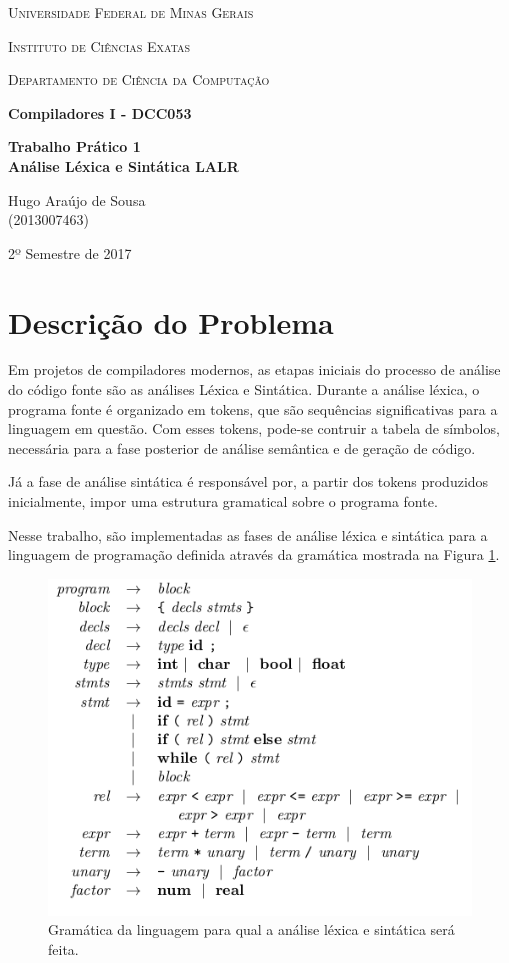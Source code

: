 \documentclass[a4paper,12pt]{report}
\begin{document}
\begin{titlepage}
	\centering
	{\scshape\LARGE Universidade Federal de Minas Gerais \par}
	{\scshape\Large Instituto de Ciências Exatas \par}
	{\scshape\Large Departamento de Ciência da Computação \par}
	\vfill
	{\huge\bfseries \textbf{Compiladores I - DCC053} \par}
	{\huge\bfseries \textbf{Trabalho Prático 1\\Análise Léxica e Sintática LALR} \par}
	\vfill
	{\Large Hugo Araújo de Sousa\\(2013007463)\par}
	\vfill
	{\large 2º Semestre de 2017\par}
\end{titlepage}

\newpage
\tableofcontents
\newpage

\section{Descrição do Problema}

Em projetos de compiladores modernos, as etapas iniciais do processo de análise
do código fonte são as análises Léxica e Sintática. Durante a análise léxica, o
programa fonte é organizado em tokens, que são sequências significativas para
a linguagem em questão. Com esses tokens, pode-se contruir a tabela de símbolos,
necessária para a fase posterior de análise semântica e de geração de código.

Já a fase de análise sintática é responsável por, a partir dos tokens produzidos
inicialmente, impor uma estrutura gramatical sobre o programa fonte.

Nesse trabalho, são implementadas as fases de análise léxica e sintática para
a linguagem de programação definida através da gramática mostrada na Figura
\ref{fig:gramatica}.

\begin{figure}[h]
 \centering
 \includegraphics[scale=0.7]{grammar.png}
 \caption{Gramática da linguagem para qual a análise léxica e sintática será feita.}
 \label{fig:gramatica}
\end{figure}
\end{document}
